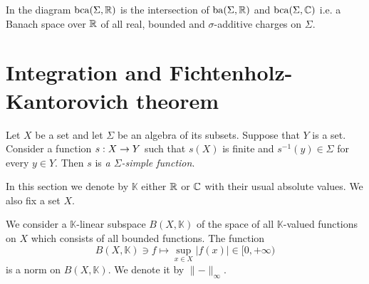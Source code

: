\begin{remark}
\begin{center}
    \end{center}
    In the diagram $\mathrm{bca}(\Sigma, {\mathbb R})$ is the intersection of $\mathrm{ba}(\Sigma,{\mathbb R})$ and $\mathrm{bca}(\Sigma,{\mathbb C})$ i.e. a Banach space over ${\mathbb R}$ of all real, bounded and $\sigma$-additive charges on $\Sigma$.
\end{remark}

\section{Integration and Fichtenholz-Kantorovich theorem}

\begin{definition}
    Let $X$ be a set and let $\Sigma$ be an algebra of its subsets. Suppose that $Y$ is a set. Consider a function $s:X\rightarrow Y$ such that $s(X)$ is finite and $s^{-1}(y) \in \Sigma$ for every $y \in Y$. Then $s$ is \textit{a $\Sigma$-simple function}.
\end{definition}
\noindent
In this section we denote by $\mathbb{K}$ either ${\mathbb R}$ or ${\mathbb C}$ with their usual absolute values. We also fix a set $X$.

We consider a $\mathbb{K}$-linear subspace $B(X,\mathbb{K})$ of the space of all $\mathbb{K}$-valued functions on $X$ which consists of all bounded functions. The function
$$B(X,\mathbb{K}) \ni f \mapsto \sup_{x\in X}|f(x)|\in [0,+\infty)$$
is a norm on $B(X, \mathbb{K})$. We denote it by $\lVert-\rVert_{\infty}$.

